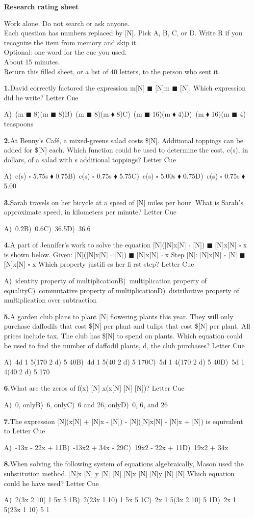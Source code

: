 \documentclass[10pt]{article}
\newcommand{\opA}{\ensuremath{\square}}
\newcommand{\opB}{\ensuremath{\blacksquare}}
\newcommand{\opC}{\ensuremath{\blacklozenge}}
\newcommand{\Q}[6]{%
  \par\vspace{0.38em}%
  \noindent\textbf{#1.}\enspace #2\hfill
  Letter \underline{\hspace{1.05em}}\enspace Cue \underline{\hspace{1.8em}}\par
  \nobreak
  {\small\noindent A)\ #3\quad B)\ #4\quad C)\ #5\quad D)\ #6\par}%
}
\begin{document}
{\large\bfseries Research rating sheet}

\vspace{0.28em}
\noindent Work alone. Do not search or ask anyone.\\
Each question has numbers replaced by [N]. Pick A, B, C, or D. Write R if you recognize the item from memory and skip it.\\
Optional: one word for the cue you used.\\
About 15 minutes.\\
Return this filled sheet, or a list of 40 letters, to the person who sent it.

\vspace{0.12em}
\Q{1}{David correctly factored the expression m[N] \opB{} [N]m \opB{} [N]. Which expression did he write?}{(m \opB{} 8)(m \opB{} 8)}{(m \opB{} 8)(m \opC{} 8)}{(m \opB{} 16)(m \opC{} 4)}{(m \opC{} 16)(m \opB{} 4) teaspoons}
\Q{2}{At Benny's Caf\'e, a mixed-greens salad costs \$[N]. Additional toppings can be added for \$[N] each. Which function could be used to determine the cost, c(s), in dollars, of a salad with s additional toppings?}{c(s) \opA{} 5.75s \opC{} 0.75}{c(s) \opA{} 0.75s \opC{} 5.75}{c(s) \opA{} 5.00s \opC{} 0.75}{c(s) \opA{} 0.75s \opC{} 5.00}
\Q{3}{Sarah travels on her bicycle at a speed of [N] miles per hour. What is Sarah's approximate speed, in kilometers per minute?}{0.2}{0.6}{36.5}{36.6}
\Q{4}{A part of Jennifer's work to solve the equation [N]([N]x[N] \opA{} [N]) \opB{} [N]x[N] \opA{} x is shown below. Given: [N]([N]x[N] \opA{} [N]) \opB{} [N]x[N] \opA{} x Step [N]: [N]x[N] \opA{} [N] \opB{} [N]x[N] \opA{} x Which property justifi es her fi rst step?}{identity property of multiplication}{multiplication property of equality}{commutative property of multiplication}{distributive property of multiplication over subtraction}
\Q{5}{A garden club plans to plant [N] flowering plants this year. They will only purchase daffodils that cost \$[N] per plant and tulips that cost \$[N] per plant. All prices include tax. The club has \$[N] to spend on plants. Which equation could be used to find the number of daffodil plants, d, the club purchases?}{4d 1 5(170 2 d) 5 40}{4d 1 5(40 2 d) 5 170}{5d 1 4(170 2 d) 5 40}{5d 1 4(40 2 d) 5 170}
\Q{6}{What are the zeros of f(x) [N] x(x[N] [N] [N])?}{0, only}{6, only}{6 and 26, only}{0, 6, and 26}
\Q{7}{The expression [N](x[N] + [N]x - [N]) - [N]([N]x[N] - [N]x + [N]) is equivalent to}{-13x - 22x + 11}{-13x2 + 34x - 29}{19x2 - 22x + 11}{19x2 + 34x \- 29}
\Q{8}{When solving the following system of equations algebraically, Mason used the substitution method. [N]x [N] y [N] [N] [N]x [N] [N]y [N] [N] Which equation could he have used?}{2(3x 2 10) 1 5x 5 1}{2(23x 1 10) 1 5x 5 1}{2x 1 5(3x 2 10) 5 1}{2x 1 5(23x 1 10) 5 1}
\end{document}
